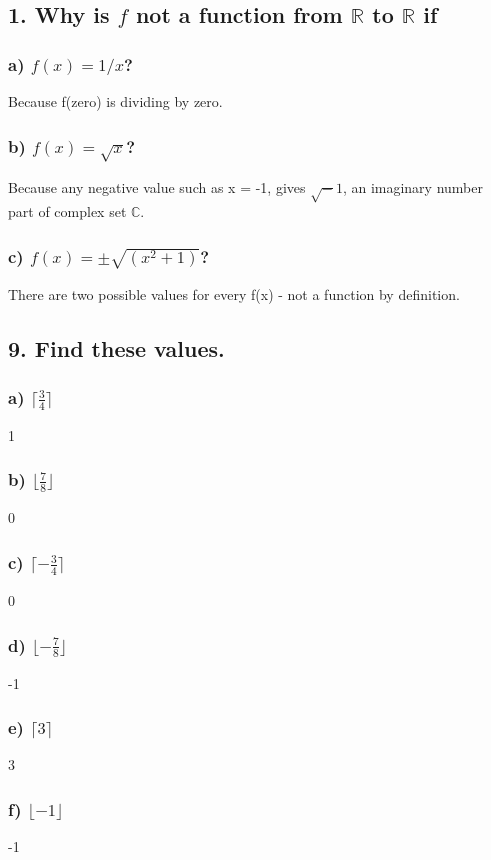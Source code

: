 \documentclass[11pt, oneside]{article} %
\numberwithin{equation}{section} %
\numberwithin{figure}{section} %
\numberwithin{table}{section} %
\begin{document}
\subsection{1. Why is $f$ not a function from $\mathbb{R}$ to $\mathbb{R}$ if}
\subsubsection{a) $f(x)=1/x$?}
Because f(zero) is dividing by zero.
\subsubsection{b) $f(x)= \sqrt x$?}
Because any negative value such as x = -1, gives $\sqrt -1$, an imaginary number part of complex set $\mathbb{C}$.
\subsubsection{c) $f(x)=\pm \sqrt{(x^2+1)}$?}
There are two possible values for every f(x) - not a function by definition.

\subsection{9. Find these values.}
\subsubsection{a) $\lceil \frac{3}{4}\rceil$}
1
\subsubsection{b) $\lfloor \frac{7}{8}\rfloor $}
0
\subsubsection{c) $\lceil -\frac{3}{4}\rceil$}
0
\subsubsection{d) $\lfloor -\frac{7}{8}\rfloor$}
-1
\subsubsection{e) $\lceil 3\rceil$} 
3
\subsubsection{f) $\lfloor -1\rfloor$}
-1
\end{document}
